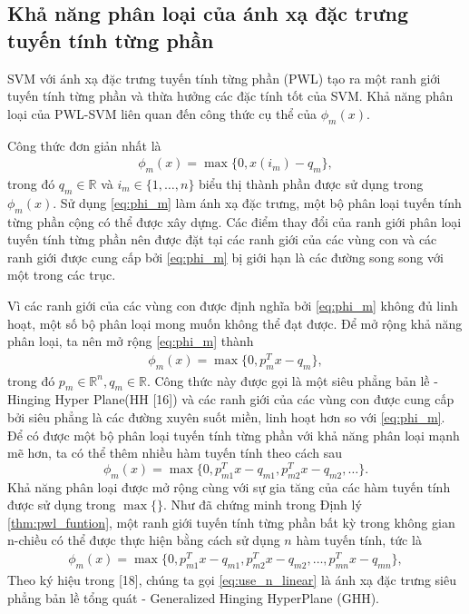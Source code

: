 \subsection{Khả năng phân loại của ánh xạ đặc trưng tuyến tính từng phần}
SVM với ánh xạ đặc trưng tuyến tính từng phần (PWL) tạo ra một ranh giới tuyến tính từng phần và thừa hưởng các đặc tính tốt của SVM. Khả năng phân loại của PWL-SVM liên quan đến công thức cụ thể của \( \phi_m(x) \).

\noindent Công thức đơn giản nhất là
\begin{align}
    \phi_m(x) = \max\{0, x(i_m) - q_m\},
    \label{eq:phi_m}
\end{align}
trong đó \( q_m \in \mathbb{R} \) và \( i_m \in \{1, \ldots, n\} \) biểu thị thành phần được sử dụng trong \( \phi_m(x) \). Sử dụng \eqref{eq:phi_m} làm ánh xạ đặc trưng, một bộ phân loại tuyến tính từng phần cộng có thể được xây dựng. Các điểm thay đổi của ranh giới phân loại tuyến tính từng phần nên được đặt tại các ranh giới của các vùng con và các ranh giới được cung cấp bởi \eqref{eq:phi_m} bị giới hạn là các đường song song với một trong các trục.

Vì các ranh giới của các vùng con được định nghĩa bởi \eqref{eq:phi_m} không đủ linh hoạt, một số bộ phân loại mong muốn không thể đạt được. Để mở rộng khả năng phân loại, ta nên mở rộng \eqref{eq:phi_m} thành
\begin{align}
    \phi_m(x) = \max\{0, p_m^T x - q_m\},
    \label{eq:phi_m_extend}
\end{align}
trong đó \( p_m \in \mathbb{R}^n, q_m \in \mathbb{R} \). Công thức này được gọi là một siêu phẳng bản lề - Hinging Hyper Plane(HH [16]) và các ranh giới của các vùng con được cung cấp bởi siêu phẳng là các đường xuyên suốt miền, linh hoạt hơn so với \eqref{eq:phi_m}. Để có được một bộ phân loại tuyến tính từng phần với khả năng phân loại mạnh mẽ hơn, ta có thể thêm nhiều hàm tuyến tính theo cách sau
\[
\phi_m(x) = \max\{0, p_{m1}^T x - q_{m1}, p_{m2}^T x - q_{m2}, \ldots\}.
\]
Khả năng phân loại được mở rộng cùng với sự gia tăng của các hàm tuyến tính được sử dụng trong \(\max\{\}\). Như đã chứng minh trong Định lý \ref{thm:pwl_funtion}, một ranh giới tuyến tính từng phần bất kỳ trong không gian n-chiều có thể được thực hiện bằng cách sử dụng \(n\) hàm tuyến tính, tức là
\begin{align}
    \phi_m(x) = \max\{0, p_{m1}^T x - q_{m1}, p_{m2}^T x - q_{m2}, \ldots, p_{mn}^T x - q_{mn}\},
    \label{eq:use_n_linear}
\end{align}
Theo ký hiệu trong [18], chúng ta gọi \eqref{eq:use_n_linear} là ánh xạ đặc trưng siêu phẳng bản lề tổng quát - Generalized Hinging HyperPlane (GHH).

